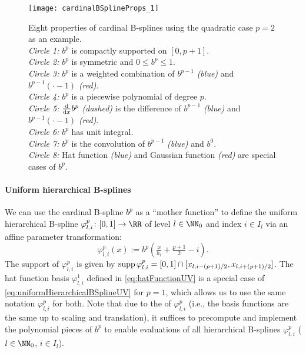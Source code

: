 \begin{figure}
  \texttt{[image: cardinalBSplineProps\_1]}%
  \caption{%
    Eight properties of cardinal B-splines using the quadratic case
    $p = 2$ as an example.\\
    \emph{Circle 1:} $b^p$ is compactly supported on $[0, p+1]$.\\
    \emph{Circle 2:} $b^p$ is symmetric and $0 \le b^p \le 1$.\\
    \emph{Circle 3:} $b^p$ is a weighted combination of
    $b^{p-1}$ \emph{\textcolor{C0}{(blue)}} and
    $b^{p-1}({\cdot} - 1)$ \emph{\textcolor{C1}{(red)}}.\\
    \emph{Circle 4:} $b^p$ is a piecewise polynomial of degree $p$.\\
    \emph{Circle 5:} $\frac{\mathop{}\!\mathrm{d}}{\mathop{}\!\mathrm{d}{}x} b^p$ \emph{(dashed)}
    is the difference of
    $b^{p-1}$ \emph{\textcolor{C0}{(blue)}} and
    $b^{p-1}({\cdot} - 1)$ \emph{\textcolor{C1}{(red)}}.\\
    \emph{Circle 6:} $b^p$ has unit integral.\\
    \emph{Circle 7:} $b^p$ is the convolution of
    $b^{p-1}$ \emph{\textcolor{C0}{(blue)}} and $b^0$.\\
    \emph{Circle 8:} Hat function \emph{\textcolor{C0}{(blue)}} and
    Gaussian function \emph{\textcolor{C1}{(red)}}
    are special cases of $b^p$.%
  }%
  \label{fig:cardinalBSplineProps}
\end{figure}

\paragraph{Uniform hierarchical B-splines}

%
We can use the cardinal B-spline $b^p$ as a ``mother function'' to
define the uniform hierarchical B-spline
$\varphi_{l,i}^p\colon [0, 1] \to \RR$ of level $l \in \NN_0$ and index
$i \in I_l$ via an affine parameter transformation:
\begin{equation}
  \label{eq:uniformHierarchicalBSplineUV}
  \varphi_{l,i}^p(x)
  := b^p(\tfrac{x}{h_l} + \tfrac{p+1}{2} - i).
\end{equation}
The support of $\varphi_{l,i}^p$ is given
by $\operatorname{supp} \varphi_{l,i}^p = [0, 1] \cap [x_{l,i-(p+1)/2}, x_{l,i+(p+1)/2}]$.
The hat function basis $\varphi_{l,i}^1$ defined in
\eqref{eq:hatFunctionUV} is a special case of
\eqref{eq:uniformHierarchicalBSplineUV} for $p = 1$,
which allows us to use the same notation $\varphi_{l,i}^p$ for both.
Note that due to the  of $\varphi_{l,i}^p$
(i.e., the basis functions are the same up to scaling and translation),
it suffices to precompute and implement the polynomial pieces of $b^p$
to enable evaluations of all hierarchical B-splines
$\varphi_{l,i}^p$ ($l \in \NN_0$, $i \in I_l$).

